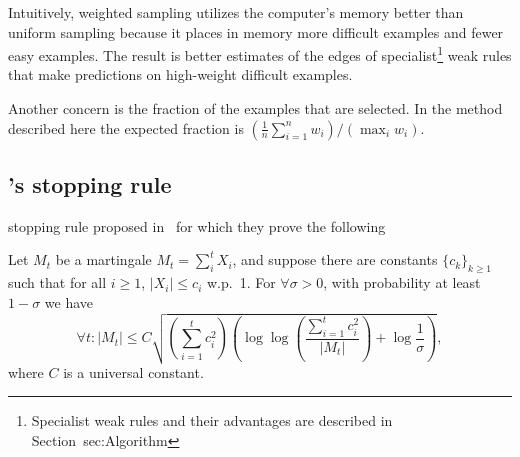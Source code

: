 Intuitively, weighted sampling utilizes the computer's memory better
than uniform sampling because it places in memory more difficult
examples and fewer easy examples. The result is better estimates of
the edges of specialist\footnote{Specialist weak rules and their
  advantages are described in Section~{sec:Algorithm}} weak rules that
make predictions on high-weight difficult examples.


Another concern is the fraction of the examples that are selected. In
the method described here the expected fraction is $(\frac{1}{n}
\sum_{i=1}^n w_i)/(\max_i w_i)$.

\subsection{\Sparrow's stopping rule} \label{sec:balsubramani}
 stopping rule proposed
in~\cite{balsubramani_sharp_2014} for which they prove the following

\begin{theorem} \label{thm:balsubramani}
  Let $M_t$ be a martingale $M_t = \sum_i^t X_i$,
  and suppose there are constants $\{c_k\}_{k \geq 1}$ such that
  for all $i \geq 1$, $|X_i| \leq c_i$ w.p.\ 1.
  For $\forall \sigma > 0$, with probability at least $1 - \sigma$ we have
  \[
  \forall t: |M_t| \leq C \sqrt{
    \left( \sum_{i=1}^t c_i^2 \right)
    \left( \log \log \left( \frac{ \sum_{i=1}^t c_i^2 }{ |M_t| }\right) +
    \log \frac{1}{\sigma} \right)
  },
  \]
  where $C$ is a universal constant.
\end{theorem}
